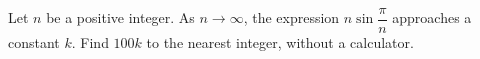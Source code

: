 Let $n$ be a positive integer. As $n\to\infty$, the expression $n\sin\dfrac{\pi}{n}$ approaches a constant $k$. Find $100k$ to the nearest integer, without a calculator.
